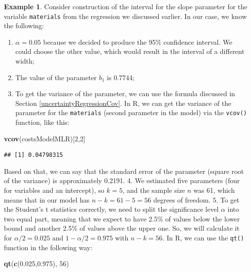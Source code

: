 \documentclass[
]{book}
\newenvironment{Shaded}{\begin{snugshade}}{\end{snugshade}}
\newcommand{\DecValTok}[1]{\textcolor[rgb]{0.00,0.00,0.81}{#1}}
\newcommand{\FloatTok}[1]{\textcolor[rgb]{0.00,0.00,0.81}{#1}}
\newcommand{\FunctionTok}[1]{\textcolor[rgb]{0.13,0.29,0.53}{\textbf{#1}}}
\newcommand{\NormalTok}[1]{#1}
\providecommand{\tightlist}{%
  \setlength{\itemsep}{0pt}\setlength{\parskip}{0pt}}
\theoremstyle{definition}
\theoremstyle{definition}
\newtheorem{example}{Example}[chapter]
\theoremstyle{definition}
\theoremstyle{definition}
\theoremstyle{remark}
\begin{document}
\begin{example}
Consider construction of the interval for the slope parameter for the variable \texttt{materials} from the regression we discussed earlier. In our case, we know the following:

\begin{enumerate}
\def\labelenumi{\arabic{enumi}.}
\tightlist
\item
  \(\alpha=0.05\) because we decided to produce the 95\% confidence interval. We could choose the other value, which would result in the interval of a different width;
\item
  The value of the parameter \(b_1\) is 0.7744;
\item
  To get the variance of the parameter, we can use the formula discussed in Section \ref{uncertaintyRegressionCov}. In R, we can get the variance of the parameter for the \texttt{materials} (second parameter in the model) via the \texttt{vcov()} function, like this:
\end{enumerate}

\begin{Shaded}
\begin{Highlighting}[]
\FunctionTok{vcov}\NormalTok{(costsModelMLR)[}\DecValTok{2}\NormalTok{,}\DecValTok{2}\NormalTok{]}
\end{Highlighting}
\end{Shaded}

\begin{verbatim}
## [1] 0.04798315
\end{verbatim}

Based on that, we can say that the standard error of the parameter (square root of the variance) is approximately 0.2191.
4. We estimated five parameters (four for variables and an intercept), so \(k=5\), and the sample size \(n\) was 61, which means that in our model has \(n-k=61-5=56\) degrees of freedom.
5. To get the Student's t statistics correctly, we need to split the significance level \(\alpha\) into two equal part, meaning that we expect to have 2.5\% of values below the lower bound and another 2.5\% of values above the upper one. So, we will calculate it for \(\alpha/2=0.025\) and \(1-\alpha/2=0.975\) with \(n-k=56\). In R, we can use the \texttt{qt()} function in the following way:

\begin{Shaded}
\begin{Highlighting}[]
\FunctionTok{qt}\NormalTok{(}\FunctionTok{c}\NormalTok{(}\FloatTok{0.025}\NormalTok{,}\FloatTok{0.975}\NormalTok{), }\DecValTok{56}\NormalTok{)}
\end{Highlighting}
\end{Shaded}


\end{example}
\end{document}
